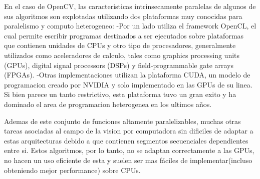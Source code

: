 \documentclass[a4paper,10pt]{report}
\begin{document}
En el caso de OpenCV, las caracteristicas intrinsecamente paralelas de algunos de sus algoritmos son explotadas utilizando dos plataformas muy conocidas para paralelismo y computo heterogeneo:
-Por un lado utiliza el framework OpenCL, el cual permite escribir programas destinados a ser ejecutados sobre plataformas que contienen unidades de CPUs y otro tipo de procesadores, 
generalmente utilizados como aceleradores de calculo, tales como  graphics processing units (GPUs), digital signal processors (DSPs) y field-programmable gate arrays (FPGAs).
-Otras implementaciones utilizan la plataforma CUDA, un modelo de programacion creado por NVIDIA y solo implementado en las GPUs de su linea. Si bien parece un tanto restrictivo, 
esta plataforma tuvo un gran exito y ha dominado el area de programacion heterogenea en los ultimos años.




Ademas de este conjunto de funciones altamente paralelizables, muchas otras tareas asociadas al campo de la vision por computadora sin dificiles de adaptar
a estas arquitecturas debido a que contienen segmentos secuenciales dependientes entre si.
Estos algoritmos, por lo tanto, no se adaptan correctamente a las GPUs, no hacen un uso eficiente de esta y suelen ser mas fáciles de implementar(incluso obteniendo mejor performance) sobre CPUs.

\end{document}
